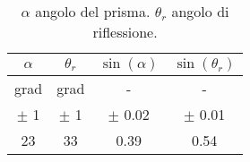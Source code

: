 \begin{table}[H]
\begin{center}
\begin{tabular}{|c|c|c|c|}
\hline
$ \alpha $ & $ \theta_{r} $ & $ \sin( \alpha ) $ & $ \sin( \theta_{r} ) $ \\ \hline
grad & grad & - & - \\ \hline
$\pm$ 1 & $\pm$ 1 & $\pm$ 0.02 & $\pm$ 0.01 \\ \hline
23 & 33 & 0.39 & 0.54 \\ \hline
\end{tabular}
\end{center}
\caption{ $ \alpha $ angolo del prisma. $ \theta_{r} $ angolo di riflessione. }
\label{O4_P1_styrene}
\end{table}
